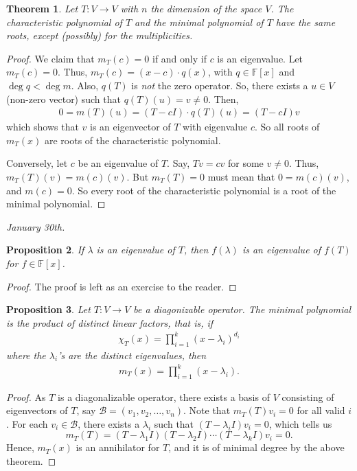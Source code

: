 \documentclass[15pt,a4paper]{book}
\newtheorem{theorem}{Theorem}[chapter]
\newtheorem{proposition}[theorem]{Proposition}
\theoremstyle{definition}
\newcommand{\mc}[1]{\mathcal{#1}}
\newcommand{\F}{\mathbb{F}}
\begin{document}
\begin{theorem}
    Let $T: V \to V$ with $n$ the dimension of the space $V$. The characteristic polynomial of $T$ and the minimal polynomial of $T$ have the same roots, except (possibly) for the multiplicities.
\end{theorem}
\begin{proof}
    We claim that $m_{T}(c) = 0$ if and only if $c$ is an eigenvalue. Let $m_{T}(c) = 0$. Thus, $m_{T}(c) = (x-c) \cdot q(x)$, with $q \in \F[x]$ and $\deg q < \deg m$. Also, $q(T)$ is \textit{not} the zero operator. So, there exists a $u \in V$ (non-zero vector) such that $q(T)(u) = v \neq 0$. Then,
    \begin{align}
        0 = m(T)(u) = (T-cI) \cdot q(T)(u) = (T-cI)v
    \end{align}
    which shows that $v$ is an eigenvector of $T$ with eigenvalue $c$. So all roots of $m_{T}(x)$ are roots of the characteristic polynomial.

    Conversely, let $c$ be an eigenvalue of $T$. Say, $Tv = cv$ for some $v \neq 0$. Thus, $m_{T}(T)(v) = m(c)(v)$. But $m_{T}(T) = 0$ must mean that $0 = m(c)(v)$, and $m(c) = 0$. So every root of the characteristic polynomial is a root of the minimal polynomial.
\end{proof}

\textit{January 30th.}
\begin{proposition}
    If $\lambda$ is an eigenvalue of $T$, then $f(\lambda)$ is an eigenvalue of $f(T)$ for $f \in \F[x]$.
\end{proposition}
\begin{proof}
    The proof is left as an exercise to the reader.
\end{proof}
\begin{proposition}
    Let $T: V \to V$ be a diagonizable operator. The minimal polynomial is the product of distinct linear factors, that is, if
    \begin{align*}
        \chi_{T}(x) = \prod_{i=1}^{k} (x-\lambda_{i})^{d_{i}}
    \end{align*}
    where the $\lambda_{i}$'s are the distinct eigenvalues, then
    \begin{align*}
        m_{T}(x) = \prod_{i=1}^{k} (x-\lambda_{i}).
    \end{align*}
\end{proposition}
\begin{proof}
    As $T$ is a diagonalizable operator, there exists a basis of $V$ consisting of eigenvectors of $T$, say $\mc{B} = (v_{1},v_{2},\ldots,v_{n})$. Note that $m_{T}(T)v_{i} = 0$ for all valid $i$. For each $v_{i} \in \mc{B}$, there exists a $\lambda_{i}$ such that $(T-\lambda_{i}I)v_{i} = 0$, which tells us
    \begin{equation}
        m_{T}(T) = (T-\lambda_{1}I)(T-\lambda_{2}I) \cdots (T-\lambda_{k}I) v_{i} = 0.
    \end{equation}
    Hence, $m_{T}(x)$ is an annihilator for $T$, and it is of minimal degree by the above theorem.
\end{proof}
\end{document}
